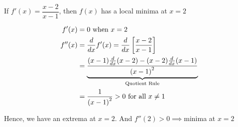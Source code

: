 \documentclass[14pt,fleqn]{extarticle}
\newcommand\dfx{ \dfrac{x-2}{x-1} }
\newcommand\ddfx{ \frac{1}{\left(x-1 \right)^2}}
\begin{document}
 
\begin{snippet}
    \correct
    
    If $f'(x) = \dfx$, then $f(x)$ has a local minima at $x = 2$ 
    
    
    \reason
    
    \begin{align}
    f'(x) &= 0 \text{ when } x = 2 \\
	f''(x) &= \ddx f'(x) = \ddx \left[\dfx \right] \\
	&= \underbrace{\dfrac{(x-1)\ddx (x-2) - (x-2)\ddx (x-1)}{\left(x-1 \right)^2}}_{\text{Quotient Rule}} \\
	&= \ddfx > 0 \text{ for all }x \neq 1
\end{align}

Hence, we have an extrema at $x=2$. And $f''(2) > 0 \implies $minima at $x=2$ 
    
\end{snippet} 
\end{document}
